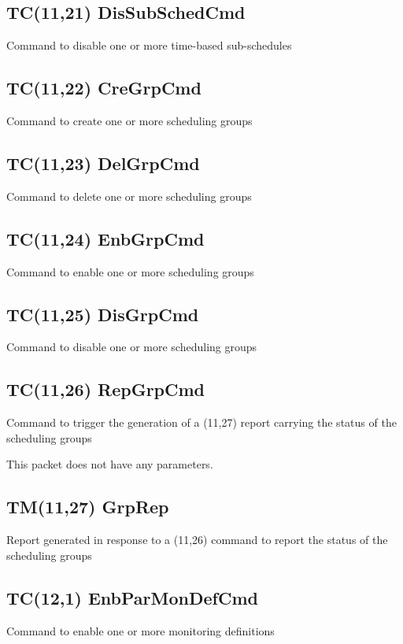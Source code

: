 \pagebreak
\subsection{TC(11,21) DisSubSchedCmd}
Command to disable one or more time-based sub-schedules

\pagebreak
\subsection{TC(11,22) CreGrpCmd}
Command to create one or more scheduling groups

\pagebreak
\subsection{TC(11,23) DelGrpCmd}
Command to delete one or more scheduling groups

\pagebreak
\subsection{TC(11,24) EnbGrpCmd}
Command to enable one or more scheduling groups

\pagebreak
\subsection{TC(11,25) DisGrpCmd}
Command to disable one or more scheduling groups

\pagebreak
\subsection{TC(11,26) RepGrpCmd}
Command to trigger the generation of a (11,27) report carrying the status of the scheduling groups

This packet does not have any parameters.

\pagebreak
\subsection{TM(11,27) GrpRep}
Report generated in response to a (11,26) command to report the status of the scheduling groups

\pagebreak
\subsection{TC(12,1) EnbParMonDefCmd}
Command to enable one or more monitoring definitions

